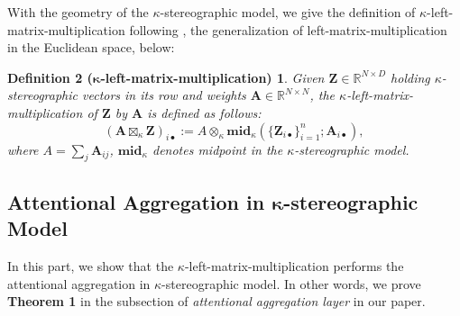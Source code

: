 With the geometry of the $\kappa$-stereographic model, we give the definition  of $\kappa$-left-matrix-multiplication following \citet{BachmannBG20}, the generalization of left-matrix-multiplication in the Euclidean space, below:
\newtheorem*{def0}{Definition 2 ($\boldsymbol \kappa$-left-matrix-multiplication)} 
\begin{def0}
Given $\mathbf{Z}\in \mathbb R^{N \times D}$ holding $\kappa$-stereographic vectors in its row and weights $\mathbf{A}\in \mathbb R^{N \times N}$, 
the $\kappa$-left-matrix-multiplication of $\mathbf{Z}$ by $\mathbf A$ is defined as follows:
\begin{equation}
\left(\mathbf{A} \boxtimes_{\kappa} \mathbf{Z}\right)_{i \bullet}:= A \otimes_{\kappa} \mathbf{mid}_{\kappa}\left( \{ \mathbf{Z}_{i \bullet}\}_{i=1}^n ; \mathbf{A}_{i \bullet}\right),
\end{equation}
where $A=\sum_{j} \mathbf A_{i j}$, $\mathbf{mid}_{\kappa}$ denotes midpoint in the $\kappa$-stereographic model.
\end{def0}

\subsection{Attentional Aggregation in  $\boldsymbol \kappa$-stereographic Model}
In this part, we show that the $\kappa$-left-matrix-multiplication performs the attentional aggregation in $\kappa$-stereographic model.
In other words, we prove \textbf{Theorem 1} in the subsection of \emph{attentional aggregation layer} in our paper.


